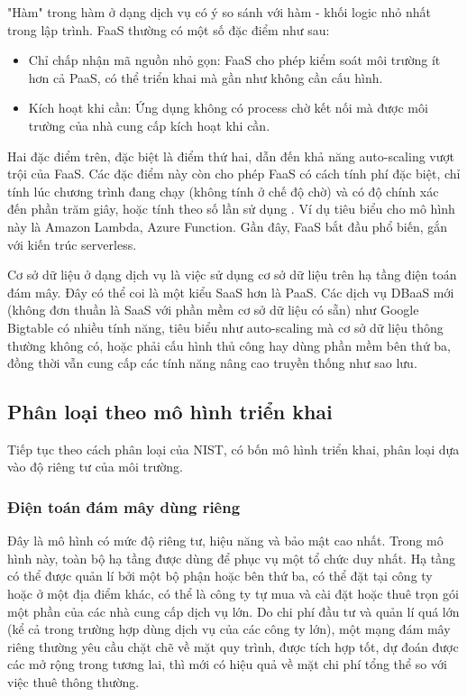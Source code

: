 \documentclass{article}
\begin{document}
"Hàm" trong hàm ở dạng dịch vụ có ý so sánh với hàm - khối logic nhỏ nhất trong
lập trình. FaaS thường có một số đặc điểm như sau:

\begin{itemize}
    \item Chỉ chấp nhận mã nguồn nhỏ gọn: FaaS cho phép kiểm soát môi trường ít
    hơn cả PaaS, có thể triển khai mà gần như không cần cấu hình.
    \item Kích hoạt khi cần: Ứng dụng không có process chờ kết nối mà được môi
    trường của nhà cung cấp kích hoạt khi cần.
\end{itemize}

Hai đặc điểm trên, đặc biệt là điểm thứ hai, dẫn đến khả năng auto-scaling vượt
trội của FaaS. Các đặc điểm này còn cho phép FaaS có cách tính phí đặc biệt, chỉ
tính lúc chương trình đang chạy (không tính ở chế độ chờ) và có độ chính xác đến
phần trăm giây, hoặc tính theo số lần sử dụng \cite{CFPvF}. Ví dụ tiêu biểu cho
mô hình này là Amazon Lambda, Azure Function. Gần đây, FaaS bắt đầu phổ biến,
gắn với kiến trúc serverless.

Cơ sở dữ liệu ở dạng dịch vụ là việc sử dụng cơ sở dữ liệu trên hạ tầng điện
toán đám mây. Đây có thể coi là một kiểu SaaS hơn là PaaS. Các dịch vụ DBaaS mới
(không đơn thuần là SaaS với phần mềm cơ sở dữ liệu có sẵn) như Google Bigtable
có nhiều tính năng, tiêu biểu như auto-scaling mà cơ sở dữ liệu thông thường
không có, hoặc phải cấu hình thủ công hay dùng phần mềm bên thứ ba, đồng thời
vẫn cung cấp các tính năng nâng cao truyền thống như sao lưu.

\subsection{Phân loại theo mô hình triển khai}

Tiếp tục theo cách phân loại của NIST, có bốn mô hình triển khai, phân loại dựa
vào độ riêng tư của môi trường.

\subsubsection{Điện toán đám mây dùng riêng}

Đây là mô hình có mức độ riêng tư, hiệu năng và bảo mật cao nhất. Trong mô hình
này, toàn bộ hạ tầng được dùng để phục vụ một tổ chức duy nhất. Hạ tầng có thể
được quản lí bởi một bộ phận hoặc bên thứ ba, có thể đặt tại công ty hoặc ở một
địa điểm khác, có thể là công ty tự mua và cài đặt hoặc thuê trọn gói một phần
của các nhà cung cấp dịch vụ lớn. Do chi phí đầu tư và quản lí quá lớn (kể cả
trong trường hợp dùng dịch vụ của các công ty lớn), một mạng đám mây riêng
thường yêu cầu chặt chẽ về mặt quy trình, được tích hợp tốt, dự đoán được các mở
rộng trong tương lai, thì mới có hiệu quả về mặt chi phí tổng thể so với việc
thuê thông thường.
\end{document}
